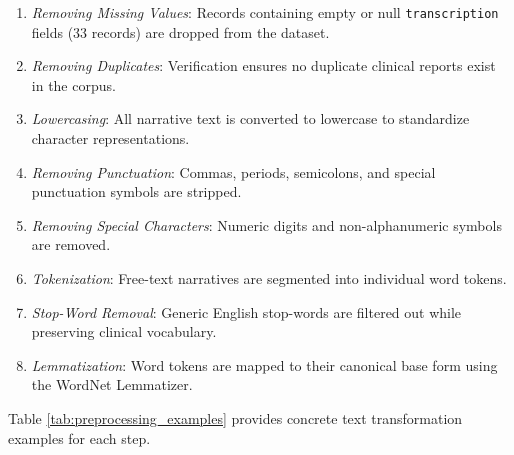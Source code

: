 \begin{enumerate}
    \item \textit{Removing Missing Values}: Records containing empty or null \texttt{transcription} fields (33 records) are dropped from the dataset.
    \item \textit{Removing Duplicates}: Verification ensures no duplicate clinical reports exist in the corpus.
    \item \textit{Lowercasing}: All narrative text is converted to lowercase to standardize character representations.
    \item \textit{Removing Punctuation}: Commas, periods, semicolons, and special punctuation symbols are stripped.
    \item \textit{Removing Special Characters}: Numeric digits and non-alphanumeric symbols are removed.
    \item \textit{Tokenization}: Free-text narratives are segmented into individual word tokens.
    \item \textit{Stop-Word Removal}: Generic English stop-words are filtered out while preserving clinical vocabulary.
    \item \textit{Lemmatization}: Word tokens are mapped to their canonical base form using the WordNet Lemmatizer.
\end{enumerate}

Table \ref{tab:preprocessing_examples} provides concrete text transformation examples for each step.


